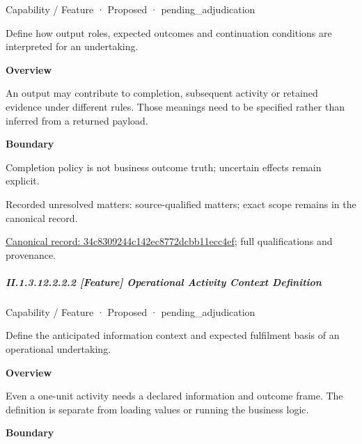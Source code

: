 \label{element:34c8309244c142ec8772dcbb11ecc4ef}
{\small Capability / Feature · Proposed · pending\_adjudication}\par

Define how output roles, expected outcomes and continuation conditions are interpreted for an undertaking.



\textbf{Overview}



An output may contribute to completion, subsequent activity or retained evidence under different rules. Those meanings need to be specified rather than inferred from a returned payload.



\textbf{Boundary}



Completion policy is not business outcome truth; uncertain effects remain explicit.


{\small Recorded unresolved matters: source-qualified matters; exact scope remains in the canonical record.}\par
{\footnotesize \href{../../../../continuum/strategy/capability/feature/34c8309244c142ec8772dcbb11ecc4ef.md}{Canonical record: 34c8309244c142ec8772dcbb11ecc4ef}; full qualifications and provenance.}\par
\subparagraph*{II.1.3.12.2.2.2 [Feature] Operational Activity Context Definition}
\label{navigation:II.1.3.12.2.2.2}

\label{element:58dcd59389664b7d83d14b536d7d03d0}
{\small Capability / Feature · Proposed · pending\_adjudication}\par

Define the anticipated information context and expected fulfilment basis of an operational undertaking.



\textbf{Overview}



Even a one-unit activity needs a declared information and outcome frame. The definition is separate from loading values or running the business logic.



\textbf{Boundary}



